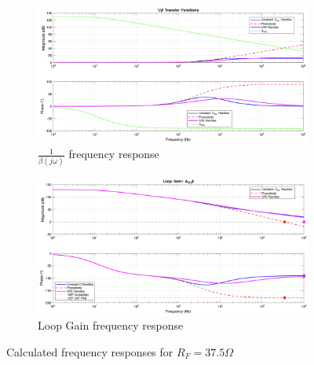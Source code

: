 \begin{figure}[H]
    \centering
    \begin{subfigure}[b]{0.5\textwidth}
        \centering
        \includegraphics[width=\textwidth]{MatLabBeta_37,5.png}
        \caption{$\frac{1}{\beta(j\omega)}$ frequency response}
        \label{fig:matlab_beta_37.5}
    \end{subfigure}\hfill
    \begin{subfigure}[b]{0.5\textwidth}
        \centering
        \includegraphics[width=\textwidth]{MatLabLG_37,5.png}
        \caption{Loop Gain frequency response}
        \label{fig:matlab_cl_37.5}
    \end{subfigure}
    \caption{Calculated frequency responses for $R_F=37.5\Omega$}
    \label{fig:matlab_37.5}
\end{figure}
